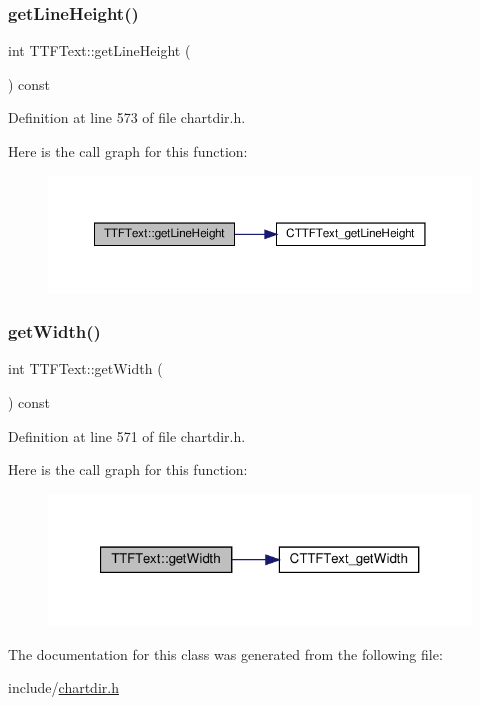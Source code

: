 \subsubsection{\texorpdfstring{get\+Line\+Height()}{getLineHeight()}}
{\footnotesize\ttfamily int T\+T\+F\+Text\+::get\+Line\+Height (\begin{DoxyParamCaption}{ }\end{DoxyParamCaption}) const\hspace{0.3cm}{\ttfamily [inline]}}



Definition at line 573 of file chartdir.\+h.

Here is the call graph for this function\+:
\nopagebreak
\begin{figure}[H]
\begin{center}
\leavevmode
\includegraphics[width=350pt]{class_t_t_f_text_a3752a7851404645f3f541cf568855f3c_cgraph}
\end{center}
\end{figure}
\mbox{\label{class_t_t_f_text_a3d9fccb0597e54946f36987ae76327a1}} 
\subsubsection{\texorpdfstring{get\+Width()}{getWidth()}}
{\footnotesize\ttfamily int T\+T\+F\+Text\+::get\+Width (\begin{DoxyParamCaption}{ }\end{DoxyParamCaption}) const\hspace{0.3cm}{\ttfamily [inline]}}



Definition at line 571 of file chartdir.\+h.

Here is the call graph for this function\+:
\nopagebreak
\begin{figure}[H]
\begin{center}
\leavevmode
\includegraphics[width=321pt]{class_t_t_f_text_a3d9fccb0597e54946f36987ae76327a1_cgraph}
\end{center}
\end{figure}


The documentation for this class was generated from the following file\+:\begin{DoxyCompactItemize}
\item 
include/\hyperlink{chartdir_8h}{chartdir.\+h}\end{DoxyCompactItemize}
